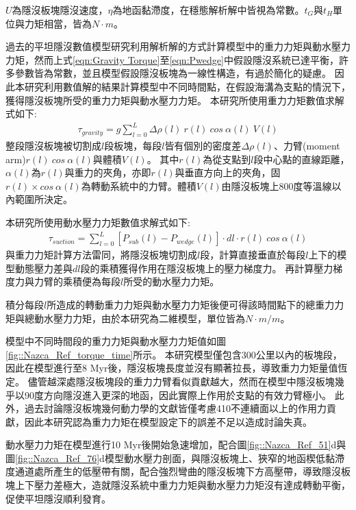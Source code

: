 $U$為隱沒板塊隱沒速度，$\eta$為地函黏滯度，在穩態解析解中皆視為常數。$t_G$與$t_H$單位與力矩相當，皆為$N\cdot m$。

過去的平坦隱沒數值模型研究利用解析解的方式計算模型中的重力力矩與動水壓力力矩，然而上式\ref{eqn:Gravity Torque}至\ref{eqn:Pwedge}中假設隱沒系統已達平衡，許多參數皆為常數，並且模型假設隱沒板塊為一線性構造，有過於簡化的疑慮。
因此本研究利用數值解的結果計算模型中不同時間點，在假設海溝為支點的情況下，獲得隱沒板塊所受的重力力矩與動水壓力力矩。
本研究所使用重力力矩數值求解式如下:
\begin{align}
    \tau_{gravity} =  g\sum ^L_{l=0} \Delta \rho(l)\ r(l)\ cos\ \alpha (l)\ V(l) 
    \label{eqn:tau_gravity}
\end{align}
整段隱沒板塊被切割成$l$段板塊，每段$l$皆有個別的密度差$\Delta \rho(l)$、力臂(moment arm)$r(l)\ cos\ \alpha (l)$與體積$V(l)$。
其中$r(l)$為從支點到$l$段中心點的直線距離，$ \alpha (l)$為$r(l)$與重力的夾角，亦即$r(l)$與垂直方向上的夾角，固$r(l)\times cos\ \alpha (l)$為轉動系統中的力臂。體積$V(l)$由隱沒板塊上800度等溫線以內範圍所決定。

本研究所使用動水壓力力矩數值求解式如下:
\begin{align}
    \tau_{suction} =  \sum ^L_{l=0} [P_{sub}(l)-P_{wedge}(l)]\cdot dl\cdot r(l)\ cos\ \alpha (l)
    \label{eqn:tau_suction}
\end{align}
與重力力矩計算方法雷同，將隱沒板塊切割成$l$段，計算直接垂直於每段$l$上下的模型動態壓力差與$dl$段的乘積獲得作用在隱沒板塊上的壓力梯度力。
再計算壓力梯度力與力臂的乘積便為每段$l$所受的動水壓力力矩。

積分每段$l$所造成的轉動重力力矩與動水壓力力矩後便可得該時間點下的總重力力矩與總動水壓力力矩，由於本研究為二維模型，單位皆為$N\cdot m/m$。

模型中不同時間段的重力力矩與動水壓力力矩值如圖\ref{fig::Nazca_Ref_torque_time}所示。
本研究模型僅包含300公里以內的板塊段，因此在模型進行至8 Myr後，隱沒板塊長度並沒有顯著拉長，導致重力力矩量值恆定。
儘管越深處隱沒板塊段的重力力臂看似貢獻越大，然而在模型中隱沒板塊幾乎以90度方向隱沒進入更深的地函，因此實際上作用於支點的有效力臂極小。
此外，過去討論隱沒板塊幾何動力學的文獻皆僅考慮410不連續面以上的作用力貢獻，因此本研究認為重力力矩在模型設定下的誤差不足以造成討論失真。

動水壓力力矩在模型進行10 Myr後開始急速增加，配合圖\ref{fig::Nazca_Ref_51}d與圖\ref{fig::Nazca_Ref_76}d模型動水壓力剖面，與隱沒板塊上、狹窄的地函楔低黏滯度通道處所產生的低壓帶有關，配合強烈彎曲的隱沒板塊下方高壓帶，導致隱沒板塊上下壓力差極大，造就隱沒系統中重力力矩與動水壓力力矩沒有達成轉動平衡，促使平坦隱沒順利發育。

